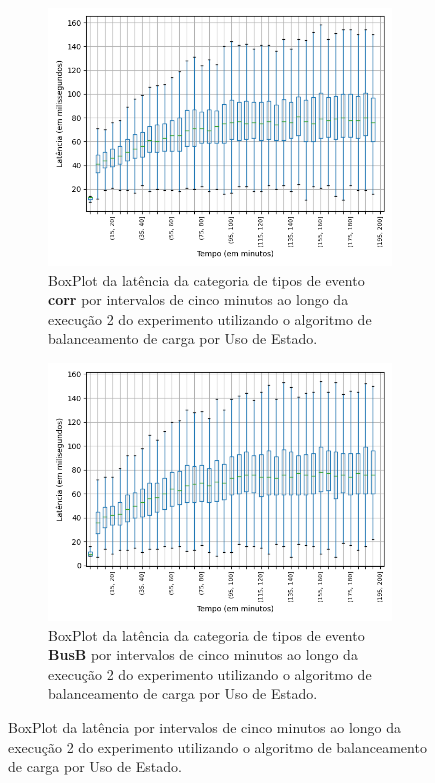 \begin{figure}
\begin{subfigure}{.5\textwidth}
\centering
\includegraphics[width=\textwidth]{figuras/graphics/boxplot_7-dez-su_corr.png}
\caption{BoxPlot da latência da categoria de tipos de evento \textbf{corr} por intervalos de cinco minutos ao longo da execução 2 do experimento utilizando o algoritmo de balanceamento de carga por Uso de Estado.}
\label{fig:BoxPlot_corr_SU_7-dez-su}
\end{subfigure}%
\begin{subfigure}{.5\textwidth}
\centering
\includegraphics[width=\textwidth]{figuras/graphics/boxplot_7-dez-su_busb.png}
\caption{BoxPlot da latência da categoria de tipos de evento \textbf{BusB} por intervalos de cinco minutos ao longo da execução 2 do experimento utilizando o algoritmo de balanceamento de carga por Uso de Estado.}
\label{fig:BoxPlot_BusB_SU_7-dez-su}
\end{subfigure}%
\caption{BoxPlot da latência por intervalos de cinco minutos ao longo da execução 2 do experimento utilizando o algoritmo de balanceamento de carga por Uso de Estado.}
\end{figure}






